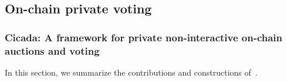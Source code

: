 \subsection{On-chain private voting}

\subsubsection{Cicada: A framework for private non-interactive on-chain auctions and voting~\texorpdfstring{\cite{EPRINT:GSZB23}}{[GSZB23]}}

In this section, we summarize the contributions and constructions of~\cite{EPRINT:GSZB23}. 
